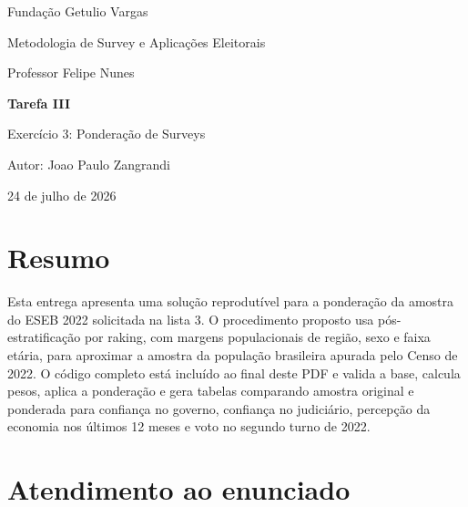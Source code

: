 \documentclass[11pt,a4paper]{article}
\begin{document}
\begin{titlepage}
\vspace*{1.7cm}
{\Large Fundação Getulio Vargas\par}
\vspace{0.35cm}
{\Large Metodologia de Survey e Aplicações Eleitorais\par}
\vspace{0.35cm}
{\large Professor Felipe Nunes\par}
\vfill
{\color{azul}\Huge\bfseries Tarefa III\par}
\vspace{0.25cm}
{\color{azul}\LARGE Exercício 3: Ponderação de Surveys\par}
\vfill
{\large Autor: Joao Paulo Zangrandi\par}
{\large 24 de julho de 2026\par}
\end{titlepage}

\section*{Resumo}

Esta entrega apresenta uma solução reprodutível para a ponderação da amostra do ESEB 2022 solicitada na lista 3. O procedimento proposto usa pós-estratificação por raking, com margens populacionais de região, sexo e faixa etária, para aproximar a amostra da população brasileira apurada pelo Censo de 2022. O código completo está incluído ao final deste PDF e valida a base, calcula pesos, aplica a ponderação e gera tabelas comparando amostra original e ponderada para confiança no governo, confiança no judiciário, percepção da economia nos últimos 12 meses e voto no segundo turno de 2022.

\section*{Atendimento ao enunciado}
\end{document}
